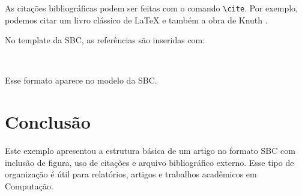 \documentclass[12pt]{article}
\begin{document}
As citações bibliográficas podem ser feitas com o comando \verb|\cite|. Por exemplo, podemos citar um livro clássico de \LaTeX \cite{lamport1994} e também a obra de Knuth \cite{knuth1984}.

No template da SBC, as referências são inseridas com:

\begin{verbatim}


\end{verbatim}

Esse formato aparece no modelo da SBC.

\section{Conclusão}

Este exemplo apresentou a estrutura básica de um artigo no formato SBC com inclusão de figura, uso de citações e arquivo bibliográfico externo. Esse tipo de organização é útil para relatórios, artigos e trabalhos acadêmicos em Computação.



\end{document}
